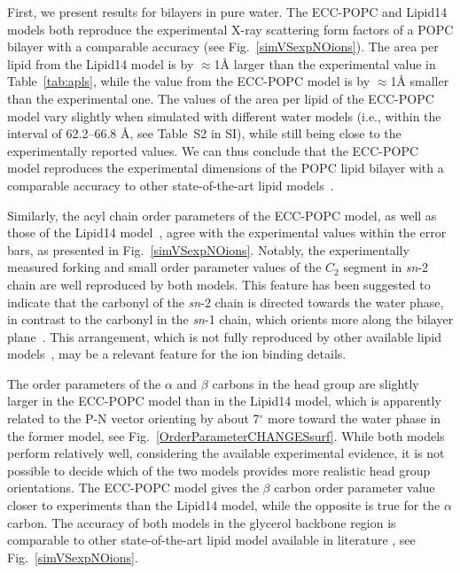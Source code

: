 \documentclass[journal=jpcbfk,manuscript=article]{achemso}
\begin{document}
First, we present results for bilayers in pure water.
The ECC-POPC and Lipid14 models both reproduce the experimental X-ray scattering form factors
of a POPC bilayer with a comparable accuracy (see Fig.~\ref{simVSexpNOions}).
The area per lipid from the Lipid14 model is by $\approx$1\AA{} larger than the
experimental value in Table~\ref{tab:apls}, while the value from the ECC-POPC model
is by $\approx$1\AA{} smaller than the experimental one.
The values of the area per lipid of the ECC-POPC model vary slightly
when simulated with different water models (i.e., within the interval of 62.2--66.8 \AA{}, see Table~S2 in SI),
while still being close to the experimentally reported values.
We can thus conclude that the ECC-POPC model reproduces the experimental dimensions of the POPC
lipid bilayer with a comparable accuracy to other state-of-the-art lipid models~\cite{ollila16}.


Similarly, the acyl chain order parameters of the ECC-POPC model, as well as those of the Lipid14 model~\cite{dickson14}, agree with the experimental values within the error bars, as presented in Fig.~\ref{simVSexpNOions}. Notably, the experimentally measured forking and small order parameter values of the $C_2$ segment in {\it sn}-2 chain are well reproduced by both models. This feature has been suggested to indicate that the carbonyl of the {\it sn}-2 chain is directed towards the water phase, in contrast to the carbonyl in the {\it sn}-1 chain, which orients more along the bilayer plane~\cite{seelig75,schindler75,gawrisch92}.
This arrangement, which is not fully reproduced by other available lipid models~\cite{ollila16}, may be a relevant feature for the ion binding details.

The order parameters of the $\alpha$ and $\beta$ carbons in the head group are slightly larger in the ECC-POPC model than in the Lipid14 model, which is apparently related to the P-N vector orienting by about 7$^{\circ}$ more toward the water phase in the former model, see Fig.~\ref{OrderParameterCHANGESsurf}. While both models perform relatively well, considering the available experimental evidence, it is not possible to decide which of the two models provides more realistic head group orientations. The ECC-POPC model gives the $\beta$ carbon order parameter value closer to experiments than the Lipid14 model, while the opposite is true for the $\alpha$ carbon. The accuracy of both models in the glycerol backbone region is comparable to other state-of-the-art lipid model available in literature \cite{botan15}, see Fig.~\ref{simVSexpNOions}.
\end{document}
